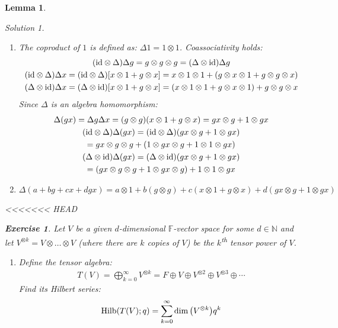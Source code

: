 \documentclass{article}
\newtheorem{Lemma}{Lemma}
\theoremstyle{definition}
\newtheorem{Exercise}{Exercise}
\theoremstyle{remark}
\newtheorem*{Solution*}{Solution}
\theoremstyle{underline}
\theoremstyle{underline}
\DeclareMathOperator{\Hilb}{Hilb}
\newcommand{\id}{\mathrm{id}}
\renewcommand{\th}{\textsuperscript{th}\xspace}
\begin{document}
\begin{Lemma}
\begin{Solution*}
\begin{enumerate}[label=(\alph*)]
			\item The coproduct of $1$ is defined as: $\Delta 1 = 1 \otimes 1$. Coassociativity holds:
			\begin{gather*}
			 	(\id \otimes \Delta) \Delta g = g \otimes g \otimes g = (\Delta \otimes \id) \Delta g \\
			 	(\id \otimes \Delta) \Delta x = (\id \otimes \Delta) \bqty{x \otimes 1 + g \otimes x} = x \otimes 1 \otimes 1 + \pqty{g \otimes x \otimes 1 + g \otimes g \otimes x} \\
			 	(\Delta \otimes \id) \Delta x = (\Delta \otimes \id)\bqty{x \otimes 1 + g \otimes x} =  \pqty{x \otimes 1 \otimes 1 + g \otimes x \otimes 1} + g \otimes g \otimes x 
			\end{gather*}
			Since $\Delta$ is an algebra homomorphism:
			\begin{gather*}
				\Delta(gx) = \Delta g \Delta x = \pqty{g \otimes g}\pqty{x \otimes 1 + g \otimes x} = gx \otimes g + 1 \otimes gx \\
				(\id \otimes \Delta)\Delta (gx) = (\id \otimes \Delta)\pqty{gx \otimes g + 1 \otimes gx} \\
				= gx \otimes g \otimes g + \pqty{1 \otimes gx \otimes g + 1 \otimes 1 \otimes gx} \\
				(\Delta \otimes \id)\Delta (gx) = (\Delta \otimes \id)\pqty{gx \otimes g + 1 \otimes gx} \\
				= \pqty{gx \otimes g \otimes g + 1 \otimes gx \otimes g} + 1 \otimes 1 \otimes gx
			\end{gather*}

			\item $\Delta(a + bg + cx + dgx) = a \otimes 1 + b(g \otimes g) + c(x \otimes 1 + g \otimes x) + d(gx \otimes g + 1 \otimes gx)$ 
		\end{enumerate}
	\end{Solution*}

<<<<<<< HEAD
	\begin{Exercise}
		Let $V$ be a given $d$-dimensional $\mathbb F$-vector space for some $d \in \mathbb N$ and let $V^{\otimes k} = V \otimes \dots \otimes V$ (where there are $k$ copies of $V$) be the \emph{$k$\th tensor power of $V$}.
		\begin{enumerate}[label=(\alph*)]
			\item Define the \emph{tensor algebra}:
			\begin{gather*}
				T(V) = \bigoplus_{k=0}^{\infty} V^{\otimes k} = F \oplus V \oplus V^{\otimes 2} \oplus V^{\otimes 3} \oplus \cdots
			\end{gather*}
			Find its \emph{Hilbert series}:
			\begin{gather*}
			 	\Hilb(T(V); q) = \sum_{k=0}^{\infty} \dim\pqty{V^{\otimes k}} q^k
			\end{gather*}


\end{enumerate}
\end{Exercise}
\end{Lemma}
\end{document}
